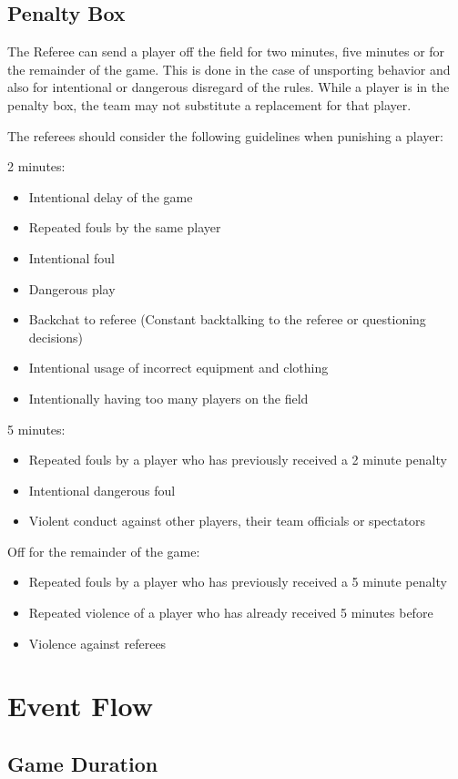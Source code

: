 \subsection{Penalty Box}
The Referee can send a player off the field for two minutes, five minutes or for the remainder of the game.
This is done in the case of unsporting behavior and also for intentional or dangerous disregard of the rules.
While a player is in the penalty box, the team may not substitute a replacement for that player.

The referees should consider the following guidelines when punishing a player:

2 minutes:
\begin{itemize}
\item Intentional delay of the game
\item Repeated fouls by the same player
\item Intentional foul
\item Dangerous play
\item Backchat to referee (Constant backtalking to the referee or questioning decisions)
\item Intentional usage of incorrect equipment and clothing
\item Intentionally having too many players on the field
\end{itemize}
5 minutes:
\begin{itemize}
\item Repeated fouls by a player who has previously received a 2 minute penalty
\item Intentional dangerous foul
\item Violent conduct against other players, their team officials or spectators
\end{itemize}
Off for the remainder of the game:
\begin{itemize}
\item Repeated fouls by a player who has previously received a 5 minute penalty
\item Repeated violence of a player who has already received 5 minutes before
\item Violence against referees
\end{itemize}

\section{Event Flow}

\subsection{Game Duration}

